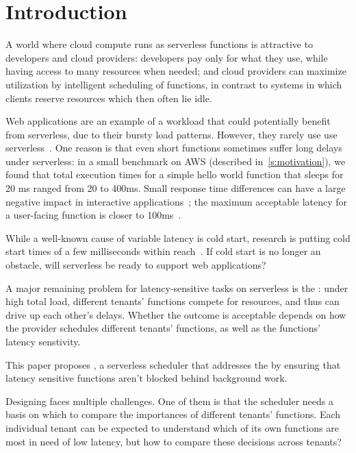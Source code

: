 \section{Introduction}
\label{s:intro}

A world where cloud compute runs as serverless functions is attractive to
developers and cloud providers: developers pay only for what they use, while having
access to many resources when needed; and cloud providers can maximize
utilization by intelligent scheduling of functions, in contrast to systems in
which clients reserve resources which then often lie idle.

Web applications are an example of a workload that could potentially benefit
from serverless, due to their bursty load patterns. However, they rarely use use
serverless~\cite{reddit-serverless1, reddit-serverless2, not-lambda-blog}. One
reason is that even short functions sometimes suffer long delays under
serverless: in a small benchmark on AWS (described in~\autoref{s:motivation}), we found that total execution times for a
simple hello world function that sleeps for 20 ms ranged from 20 to 400ms. Small
response time differences can have a large negative impact in interactive
applications~\cite{amz-page-load,google-page-load}; the maximum acceptable
latency for a user-facing function is closer to 100ms~\cite{page-load-time}.

While a well-known cause of variable latency is cold start, research is putting
cold start times of a few milliseconds within reach~\cite{sigmaos,mitosis}. If
cold start is no longer an obstacle, will serverless be ready to support web
applications?

A major remaining problem for latency-sensitive tasks on serverless is the
\emph{\problem{}}: under high total load, different tenants' functions compete
for resources, and thus can drive up each other's delays. Whether the outcome is
acceptable depends on how the provider schedules different tenants' functions,
as well as the functions' latency senstivity.

This paper proposes \sys{}, a serverless scheduler that addresses the \problem{}
by ensuring that latency sensitive functions aren't blocked behind background
work.

Designing \sys{} faces multiple challenges. One of them is that the scheduler
needs a basis on which to compare the importances of different tenants'
functions. Each individual tenant can be expected to understand which of its own
functions are most in need of low latency, but how to compare these decisions
across tenants?

